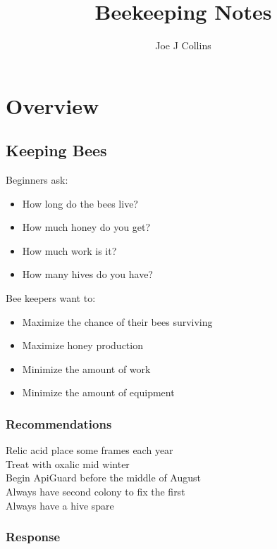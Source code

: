 \documentclass{./BeekeepingBook}
\title{Beekeeping Notes}
\author{Joe J Collins}
\date{\DTMnow}
\begin{document}
 
\maketitle
\tableofcontents

\chapter{Overview}

\section*{Keeping Bees}

Beginners ask:

\begin{itemize}
  \item How long do the bees live?
  \item How much honey do you get?
  \item How much work is it?
  \item How many hives do you have?
\end{itemize}

Bee keepers want to:

\begin{itemize}
  \item Maximize the chance of their bees surviving
  \item Maximize honey production
  \item Minimize the amount of work
  \item Minimize the amount of equipment
\end{itemize}


\subsection*{Recommendations}

\begin{description}
  \item[Relic acid place some frames each year]
  \item[Treat with oxalic mid winter]
  \item[Begin ApiGuard before the middle of August]
  \item[Always have second colony to fix the first]
  \item[Always have a hive spare]
\end{description}

\subsection*{Response}
\end{document}
